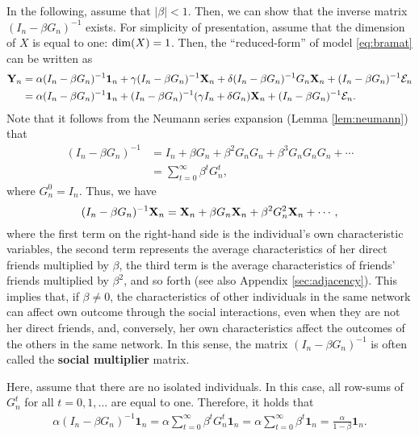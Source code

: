 \documentclass[11pt, A4paper, openany, uplatex]{book}
\begin{document}
In the following, assume that $|\beta| < 1$.
Then, we can show that the inverse matrix $(I_n - \beta G_n)^{-1}$ exists.
For simplicity of presentation, assume that the dimension of $X$ is equal to one: $\mathrm{dim}(X) = 1$.
Then, the ``reduced-form'' of model \eqref{eq:bramat} can be written as
\begin{align*}
	\mathbf{Y}_n 
	& = \alpha (I_n - \beta G_n)^{-1}\mathbf{1}_n  + \gamma (I_n - \beta G_n)^{-1}\mathbf{X}_n  + \delta (I_n - \beta G_n)^{-1} G_n \mathbf{X}_n + (I_n - \beta G_n)^{-1}\mathcal{E}_n\\
	& =  \alpha (I_n - \beta G_n)^{-1}\mathbf{1}_n  + (I_n - \beta G_n)^{-1}( \gamma I_n + \delta G_n ) \mathbf{X}_n + (I_n - \beta G_n)^{-1}\mathcal{E}_n.
\end{align*}
Note that it follows from the Neumann series expansion (Lemma \ref{lem:neumann}) that 
\begin{align*}
	 (I_n - \beta G_n)^{-1} 
	& = I_n + \beta G_n + \beta^2 G_n G_n + \beta^3 G_n G_n G_n + \cdots \\
	&= \sum_{t = 0}^\infty \beta^t G_n^t,
\end{align*}
where $G_n^0 = I_n$.
Thus, we have 
\[
	(I_n - \beta G_n)^{-1}\mathbf{X}_n = \mathbf{X}_n + \beta G_n \mathbf{X}_n + \beta^2 G_n^2\mathbf{X}_n + \cdots,
\]
where the first term on the right-hand side is the individual's own characteristic variables, the second term represents the average characteristics of her direct friends multiplied by $\beta$, the third term is the average characteristics of friends' friends multiplied by $\beta^2$, and so forth (see also Appendix \ref{sec:adjacency}).
This implies that, if $\beta \neq 0$, the characteristics of other individuals in the same network can affect own outcome through the social interactions, even when they are not her direct friends, and, conversely, her own characteristics affect the outcomes of the others in the same network.
In this sense, the matrix $(I_n - \beta G_n)^{-1} $ is often called the \textbf{social multiplier} matrix.

Here, assume that there are no isolated individuals.
In this case, all row-sums of $G_n^t$ for all $t = 0, 1, \ldots$ are equal to one.
Therefore, it holds that
\begin{align}\label{eq:intercept}
	\alpha  (I_n - \beta G_n)^{-1} \mathbf{1}_n 
	= \alpha \sum_{t = 0}^\infty \beta^t G_n^t \mathbf{1}_n 
	= \alpha  \sum_{t = 0}^\infty \beta^t \mathbf{1}_n  = \frac{\alpha}{1 - \beta}\mathbf{1}_n .
\end{align}
\bigskip
\end{document}
